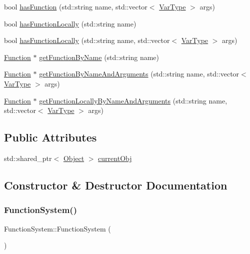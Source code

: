 \begin{DoxyCompactItemize}
bool \hyperlink{classFunctionSystem_a68dfda320aa807a9f1d16e4cfd4f25fb}{has\+Function} (std\+::string name, std\+::vector$<$ \hyperlink{classVarType}{Var\+Type} $>$ args)
\item 
bool \hyperlink{classFunctionSystem_a5bb3f64848489ff7cc4c982c08a10eaa}{has\+Function\+Locally} (std\+::string name)
\item 
bool \hyperlink{classFunctionSystem_ac4d0a40304cfb5e34db9dd47057e06d2}{has\+Function\+Locally} (std\+::string name, std\+::vector$<$ \hyperlink{classVarType}{Var\+Type} $>$ args)
\item 
\hyperlink{classFunction}{Function} $\ast$ \hyperlink{classFunctionSystem_a6ccd76d0760272b64790d6f5c8cdc607}{get\+Function\+By\+Name} (std\+::string name)
\item 
\hyperlink{classFunction}{Function} $\ast$ \hyperlink{classFunctionSystem_a4e83f6c67d1aa5ecd7167058d78e43ae}{get\+Function\+By\+Name\+And\+Arguments} (std\+::string name, std\+::vector$<$ \hyperlink{classVarType}{Var\+Type} $>$ args)
\item 
\hyperlink{classFunction}{Function} $\ast$ \hyperlink{classFunctionSystem_ae2a2f39ce6f9e107e7efd5a54a5838dc}{get\+Function\+Locally\+By\+Name\+And\+Arguments} (std\+::string name, std\+::vector$<$ \hyperlink{classVarType}{Var\+Type} $>$ args)
\end{DoxyCompactItemize}
\subsection*{Public Attributes}
\begin{DoxyCompactItemize}
\item 
std\+::shared\+\_\+ptr$<$ \hyperlink{classObject}{Object} $>$ \hyperlink{classFunctionSystem_a59f2a49d91338ced0a79d3898412fcaf}{current\+Obj}
\end{DoxyCompactItemize}


\subsection{Constructor \& Destructor Documentation}
\mbox{\label{classFunctionSystem_a66e3b5e5118f00a940c3e4a2f138c9c6}} 
\subsubsection{\texorpdfstring{Function\+System()}{FunctionSystem()}\hspace{0.1cm}{\footnotesize\ttfamily [1/3]}}
{\footnotesize\ttfamily Function\+System\+::\+Function\+System (\begin{DoxyParamCaption}{ }\end{DoxyParamCaption})}

